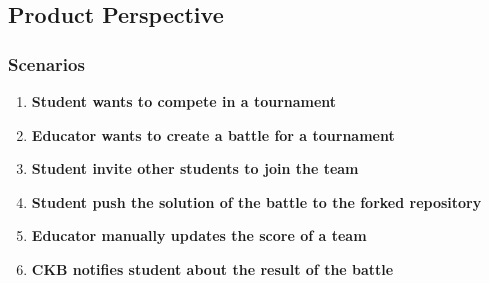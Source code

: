 \subsection{Product Perspective}
\subsubsection{Scenarios}
\begin{enumerate}
    \item \textbf{Student wants to compete in a tournament}
    \item \textbf{Educator wants to create a battle for a tournament}
    \item \textbf{Student invite other students to join the team}
    \item \textbf{Student push the solution of the battle to the forked repository}
    \item \textbf{Educator manually updates the score of a team}
    \item \textbf{CKB notifies student about the result of the battle}
\end{enumerate}
